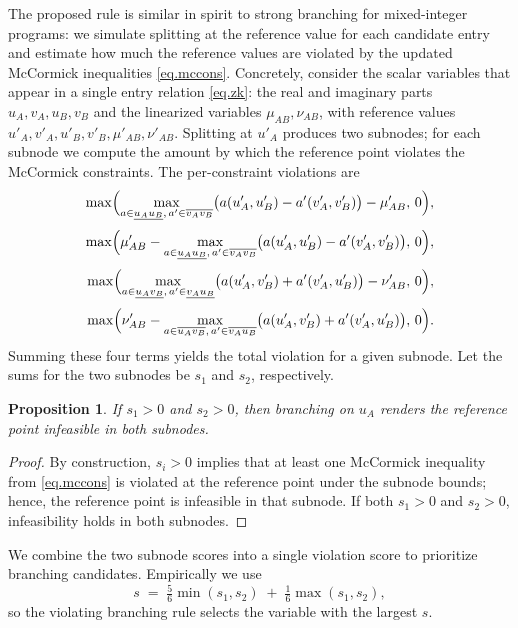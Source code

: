 \documentclass[smallextended]{svjour3}
\newtheorem{proposition}{Proposition}
\newcommand{\1}{\mathbf{1}}
\begin{document}
The proposed rule is similar in spirit to strong branching for mixed-integer programs: we simulate splitting at the reference value for each candidate entry and estimate how much the reference values are violated by the updated McCormick inequalities \eqref{eq.mccons}. Concretely, consider the scalar variables that appear in a single entry relation \eqref{eq.zk}:
the real and imaginary parts $u_A,v_A,u_B,v_B$ and the linearized variables $\mu_{AB},\nu_{AB}$, with reference values $u'_A,v'_A,u'_B,v'_B,\mu'_{AB},\nu'_{AB}$. Splitting at $u'_A$ produces two subnodes; for each subnode we compute the amount by which the reference point violates the McCormick constraints. The per-constraint violations are
\begin{subequations}
\label{eq.mcconsviolate}
\begin{align}
\max\Bigl(\max_{a\in\underline{u_A u_B},\,a'\in\overline{v_A v_B}}
\bigl(a(u'_A,u'_B)-a'(v'_A,v'_B)\bigr)-\mu'_{AB},\,0\Bigr),\\[2pt]
\max\Bigl(\mu'_{AB}-\max_{a\in\underline{u_A u_B},\,a'\in\overline{v_A v_B}}
\bigl(a(u'_A,u'_B)-a'(v'_A,v'_B)\bigr),\,0\Bigr),\\[2pt]
\max\Bigl(\max_{a\in\underline{u_A v_B},\,a'\in\underline{v_A u_B}}
\bigl(a(u'_A,v'_B)+a'(v'_A,u'_B)\bigr)-\nu'_{AB},\,0\Bigr),\\[2pt]
\max\Bigl(\nu'_{AB}-\max_{a\in\overline{u_A v_B},\,a'\in\overline{v_A u_B}}
\bigl(a(u'_A,v'_B)+a'(v'_A,u'_B)\bigr),\,0\Bigr).
\end{align}
\end{subequations}
Summing these four terms yields the total violation for a given subnode. Let the sums for the two subnodes be $s_1$ and $s_2$, respectively.

\begin{proposition}
    If $s_1>0$ and $s_2>0$, then branching on $u_A$ renders the reference point infeasible in both subnodes.
\end{proposition}
\begin{proof}
     By construction, $s_i>0$ implies that at least one McCormick inequality from \eqref{eq.mccons} is violated at the reference point under the subnode bounds; hence, the reference point is infeasible in that subnode. If both $s_1>0$ and $s_2>0$, infeasibility holds in both subnodes.
\end{proof}

We combine the two subnode scores into a single violation score to prioritize branching candidates. Empirically we use
\[
s \;=\; \tfrac{5}{6}\min(s_1,s_2) \;+\; \tfrac{1}{6}\max(s_1,s_2),
\]
 so the violating branching rule selects the variable with the largest $s$.
\end{document}
